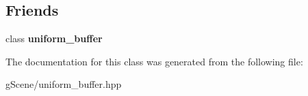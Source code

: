 \subsection*{Friends}
\begin{DoxyCompactItemize}
\item 
\hypertarget{classgfx_1_1uniform__buffer_1_1settings_a2f3d576a0049b9ee7be00fe9bd81c0df}{class {\bfseries uniform\-\_\-buffer}}\label{classgfx_1_1uniform__buffer_1_1settings_a2f3d576a0049b9ee7be00fe9bd81c0df}

\end{DoxyCompactItemize}


The documentation for this class was generated from the following file\-:\begin{DoxyCompactItemize}
\item 
g\-Scene/uniform\-\_\-buffer.\-hpp\end{DoxyCompactItemize}
